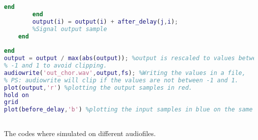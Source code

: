 \begin{lstlisting}[language=Matlab, caption= Matlab code for chorus effect]
            end
        end
        output(i) = output(i) + after_delay(j,i);
        %Signal output sample
    end
    
end
output = output / max(abs(output)); %output is rescaled to values between
% -1 and 1 to avoid clipping. 
audiowrite('out_chor.wav',output,fs); %Writing the values in a file, 
% PS: audiowrite will clip if the values are not between -1 and 1.
plot(output,'r') %plotting the output samples in red.
hold on
grid
plot(before_delay,'b') %plotting the input samples in blue on the same fig.



\end{lstlisting}

The codes where simulated on different audiofiles. 